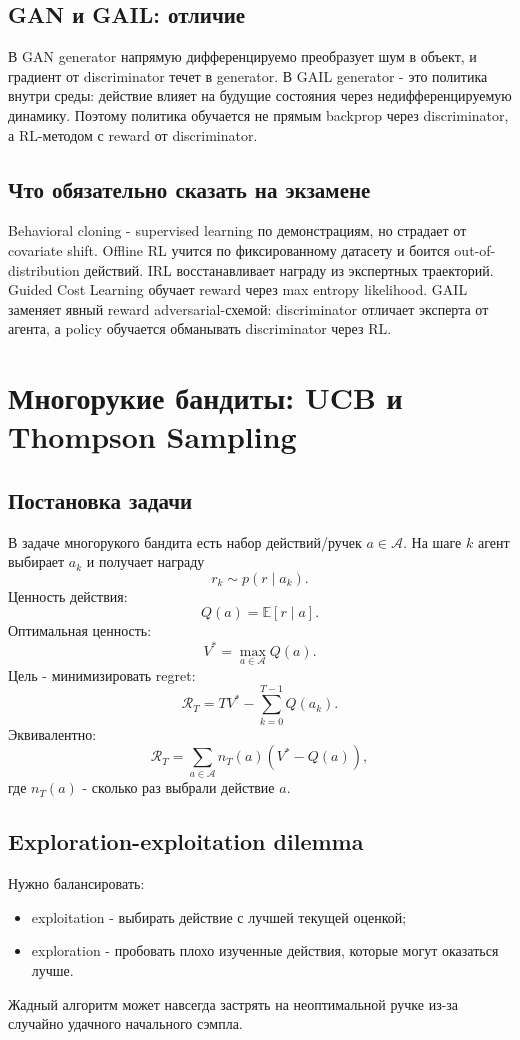 \documentclass[11pt,a4paper]{article}
\newcommand{\E}{\mathbb{E}}
\newcommand{\1}{\mathbf{1}}
\newcommand{\cA}{\mathcal A}
\begin{document}
\subsection*{GAN и GAIL: отличие}
В GAN generator напрямую дифференцируемо преобразует шум в объект, и градиент от discriminator течет в generator. В GAIL generator - это политика внутри среды: действие влияет на будущие состояния через недифференцируемую динамику. Поэтому политика обучается не прямым backprop через discriminator, а RL-методом с reward от discriminator.

\subsection*{Что обязательно сказать на экзамене}
Behavioral cloning - supervised learning по демонстрациям, но страдает от covariate shift. Offline RL учится по фиксированному датасету и боится out-of-distribution действий. IRL восстанавливает награду из экспертных траекторий. Guided Cost Learning обучает reward через max entropy likelihood. GAIL заменяет явный reward adversarial-схемой: discriminator отличает эксперта от агента, а policy обучается обманывать discriminator через RL.

\newpage
\section{Многорукие бандиты: UCB и Thompson Sampling}

\subsection*{Постановка задачи}
В задаче многорукого бандита есть набор действий/ручек $a\in\cA$. На шаге $k$ агент выбирает $a_k$ и получает награду
\[
    r_k\sim p(r\mid a_k).
\]
Ценность действия:
\[
    Q(a)=\E[r\mid a].
\]
Оптимальная ценность:
\[
    V^*=\max_{a\in\cA}Q(a).
\]
Цель - минимизировать regret:
\[
    \mathcal R_T=TV^*-
    \sum_{k=0}^{T-1}Q(a_k).
\]
Эквивалентно:
\[
    \mathcal R_T=\sum_{a\in\cA}n_T(a)(V^*-Q(a)),
\]
где $n_T(a)$ - сколько раз выбрали действие $a$.

\subsection*{Exploration-exploitation dilemma}
Нужно балансировать:
\begin{itemize}
    \item exploitation - выбирать действие с лучшей текущей оценкой;
    \item exploration - пробовать плохо изученные действия, которые могут оказаться лучше.
\end{itemize}
Жадный алгоритм может навсегда застрять на неоптимальной ручке из-за случайно удачного начального сэмпла.
\end{document}
